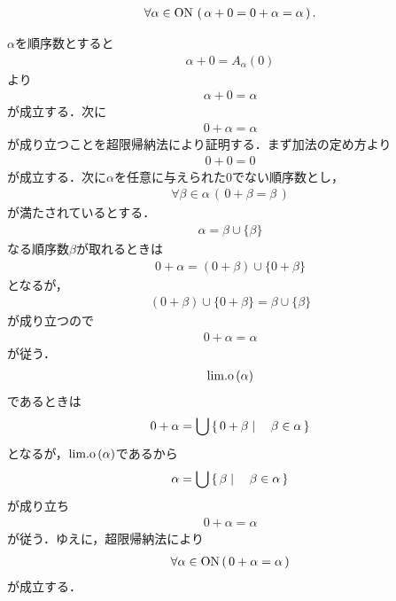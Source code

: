 	\begin{screen}
		\begin{thm}
			\begin{align}
				\forall \alpha \in \mathrm{ON}\, \left(\, \alpha + 0 = 0 + \alpha = \alpha\, \right).
			\end{align}
		\end{thm}
	\end{screen}
	
	\begin{sketch}
		$\alpha$を順序数とすると
		\begin{align}
			\alpha + 0 = A_\alpha(0)
		\end{align}
		より
		\begin{align}
			\alpha + 0 = \alpha
		\end{align}
		が成立する．次に
		\begin{align}
			0 + \alpha = \alpha
		\end{align}
		が成り立つことを超限帰納法により証明する．まず加法の定め方より
		\begin{align}
			0 + 0 = 0
		\end{align}
		が成立する．次に$\alpha$を任意に与えられた$0$でない順序数とし，
		\begin{align}
			\forall \beta \in \alpha\, (\, 0 + \beta = \beta\, )
		\end{align}
		が満たされているとする．
		\begin{align}
			\alpha = \beta \cup \{\beta\}
		\end{align}
		なる順序数$\beta$が取れるときは
		\begin{align}
			0 + \alpha = (0 + \beta) \cup \{0 + \beta\}
		\end{align}
		となるが，
		\begin{align}
			(0 + \beta) \cup \{0 + \beta\} = \beta \cup \{\beta\}
		\end{align}
		が成り立つので
		\begin{align}
			0 + \alpha = \alpha
		\end{align}
		が従う．
		\begin{align}
			\mathrm{lim.o}\left(\alpha\right)
		\end{align}
		であるときは
		\begin{align}
			0 + \alpha = \bigcup \left\{\, 0 + \beta \mid \quad \beta \in \alpha\, \right\}
		\end{align}
		となるが，$\mathrm{lim.o}\left(\alpha\right)$であるから
		\begin{align}
			\alpha = \bigcup \left\{\, \beta \mid \quad \beta \in \alpha\, \right\}
		\end{align}
		が成り立ち
		\begin{align}
			0 + \alpha = \alpha
		\end{align}
		が従う．ゆえに，超限帰納法により
		\begin{align}
			\forall \alpha \in \mathrm{ON}\, (\, 0 + \alpha = \alpha\, )
		\end{align}
		が成立する．
		\QED
	\end{sketch}
	
